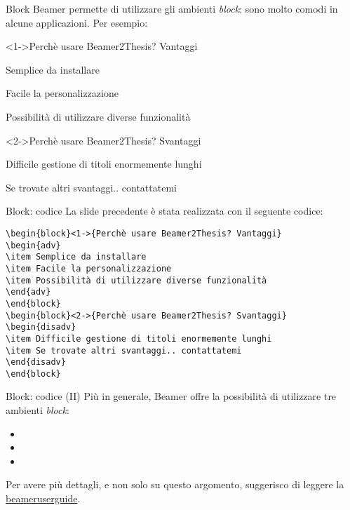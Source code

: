 \begin{tframe}{Block}
Beamer permette di utilizzare gli ambienti \emph{block}: sono molto comodi in alcune applicazioni. Per esempio:
\begin{block}<1->{Perchè usare Beamer2Thesis? Vantaggi}
\begin{adv}
\item Semplice da installare
\item Facile la personalizzazione
\item Possibilità di utilizzare diverse funzionalità
\end{adv}
\end{block}
\begin{block}<2->{Perchè usare Beamer2Thesis? Svantaggi}
\begin{disadv}
\item Difficile gestione di titoli enormemente lunghi
\item Se trovate altri svantaggi.. contattatemi
\end{disadv}
\end{block}
\end{tframe}

\begin{frame}[t,fragile]{Block: codice}
La slide precedente è stata realizzata con il seguente codice:
\small{\begin{verbatim}
\begin{block}<1->{Perchè usare Beamer2Thesis? Vantaggi}
\begin{adv}
\item Semplice da installare
\item Facile la personalizzazione
\item Possibilità di utilizzare diverse funzionalità
\end{adv}
\end{block}
\begin{block}<2->{Perchè usare Beamer2Thesis? Svantaggi}
\begin{disadv}
\item Difficile gestione di titoli enormemente lunghi
\item Se trovate altri svantaggi.. contattatemi
\end{disadv}
\end{block}
\end{verbatim}}
\end{frame}

\begin{frame}[t,fragile]{Block: codice (II)}
Più in generale, Beamer offre la possibilità di utilizzare tre ambienti \emph{block}:
\begin{itemize}
\item {}
\item {}
\item {}
\end{itemize}
Per avere più dettagli, e non solo su questo argomento, suggerisco di leggere la \href{http://mirrors.ctan.org/macros/latex/contrib/beamer/doc/beameruserguide.pdf}{beameruserguide}.
\end{frame}